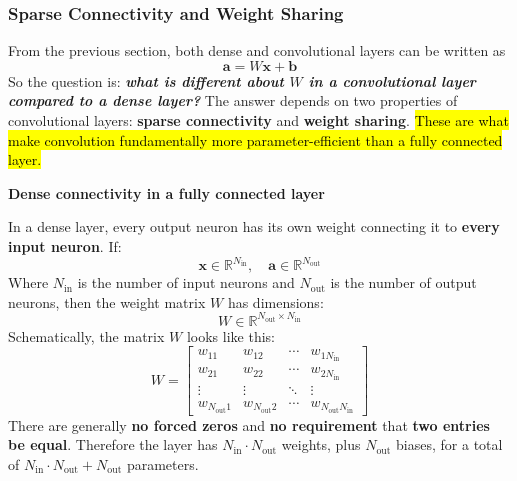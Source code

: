 \subsubsection{Sparse Connectivity and Weight Sharing}\label{sec:sparse-connectivity-and-weight-sharing}

From the previous section, both dense and convolutional layers can be written as
\begin{equation*}
    \mathbf{a} = W\mathbf{x} + \mathbf{b}
\end{equation*}
So the question is: \emph{\textbf{what is different about $W$ in a convolutional layer compared to a dense layer?}} The answer depends on two properties of convolutional layers: \textbf{sparse connectivity} and \textbf{weight sharing}. \hl{These are what make convolution fundamentally more parameter-efficient than a fully connected layer.}

\highspace
\begin{flushleft}
    \textcolor{Red2}{ \textbf{Dense connectivity in a fully connected layer}}
\end{flushleft}
In a dense layer, every output neuron has its own weight connecting it to \textbf{every input neuron}. If:
\begin{equation*}
    \mathbf{x} \in \mathbb{R}^{N_{\text{in}}}, \quad \mathbf{a} \in \mathbb{R}^{N_{\text{out}}}
\end{equation*}
Where $N_{\text{in}}$ is the number of input neurons and $N_{\text{out}}$ is the number of output neurons, then the weight matrix $W$ has dimensions:
\begin{equation*}
    W \in \mathbb{R}^{N_{\text{out}} \times N_{\text{in}}}
\end{equation*}
Schematically, the matrix $W$ looks like this:
\begin{equation*}
    W = \begin{bmatrix}
        w_{11} & w_{12} & \cdots & w_{1N_{\text{in}}} \\
        w_{21} & w_{22} & \cdots & w_{2N_{\text{in}}} \\
        \vdots & \vdots & \ddots & \vdots \\
        w_{N_{\text{out}}1} & w_{N_{\text{out}}2} & \cdots & w_{N_{\text{out}}N_{\text{in}}}
    \end{bmatrix}
\end{equation*}
There are generally \textbf{no forced zeros} and \textbf{no requirement} that \textbf{two entries be equal}. Therefore the layer has $N_{\text{in}} \cdot N_{\text{out}}$ weights, plus $N_{\text{out}}$ biases, for a total of $N_{\text{in}} \cdot N_{\text{out}} + N_{\text{out}}$ parameters.

